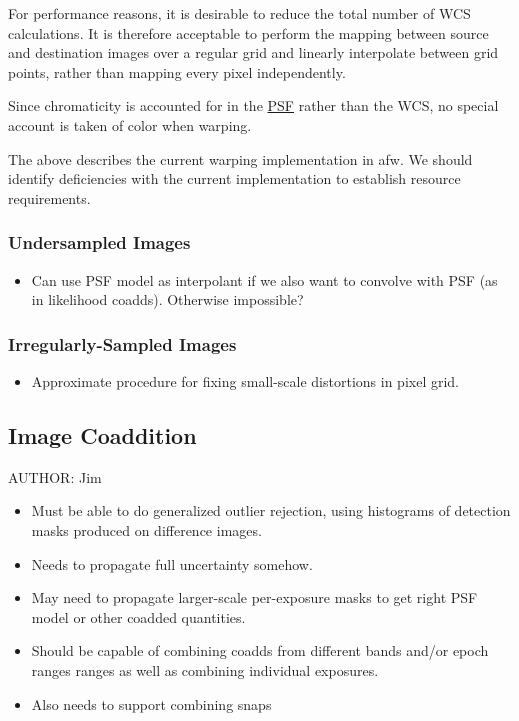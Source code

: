 For performance reasons, it is desirable to reduce the total number of WCS calculations. It is therefore acceptable to perform the mapping between source and destination images over a regular grid and linearly interpolate between grid points, rather than mapping every pixel independently.

Since chromaticity is accounted for in the \hyperref[sec:spPSF]{PSF} rather than the WCS, no special account is taken of color when warping.

\begin{note}
The above describes the current warping implementation in afw. We should identify deficiencies with the current implementation to establish resource requirements.
\end{note}

\subsubsection{Undersampled Images}
\label{sec:acUndersampledWarping}
\begin{itemize}
\item Can use PSF model as interpolant if we also want to convolve with PSF (as in likelihood coadds).  Otherwise impossible?
\end{itemize}
\subsubsection{Irregularly-Sampled Images}
\label{sec:acFixPixelAreaVariations}
\begin{itemize}
\item Approximate procedure for fixing small-scale distortions in pixel grid.
\end{itemize}

\subsection{Image Coaddition}
\label{sec:acCoaddition}
AUTHOR: Jim
\begin{itemize}
\item Must be able to do generalized outlier rejection, using histograms of detection masks produced on difference images.
\item Needs to propagate full uncertainty somehow.
\item May need to propagate larger-scale per-exposure masks to get right PSF model or other coadded quantities.
\item Should be capable of combining coadds from different bands and/or epoch ranges ranges as well as combining individual exposures.
\item Also needs to support combining snaps
\end{itemize}

